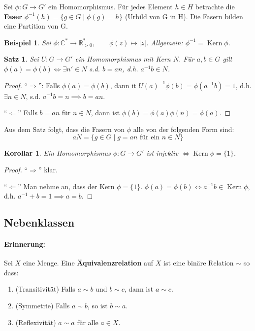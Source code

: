 \documentclass{article}
\theoremstyle{plain}
\newtheorem{theorem}{Satz}
\newtheorem{corollary}{Korollar}
\newtheorem{beispiel}{Beispiel}
\renewcommand{\ker}{\mathop{\mathrm{Kern}}}
\newcommand{\defn}[1]{\textbf{#1}}
\newcommand{\R}{\mathbb{R}}
\newcommand{\C}{\mathbb{C}}
\begin{document}
Sei $\phi\colon G\to G'$ ein Homomorphismus. Für jedes Element $h\in H$ betrachte die \defn{Faser} $\phi^{-1}(h)=\{g\in G\mid\phi(g)=h\}$ (Urbild von G in H).
Die Fasern bilden eine Partition von G.

\begin{beispiel} Sei $\phi\colon \C^*\to\R^*_{>0},\qquad \phi(z)\mapsto |z|$.\qquad
Allgemein: $\phi^{-1} = \ker \phi$.
\end{beispiel}

\begin{theorem}
    Sei $U: G\to G'$ ein Homomorphismus mit Kern $N$. Für $a,b\in G$ gilt $\phi(a)=\phi(b) \Leftrightarrow \exists n'\in N$ s.d. $b=an$, d.h. $a^{-1}b\in N$.
\end{theorem}
\begin{proof}
    ``$\Rightarrow$'': Falls $\phi(a)=\phi(b)$, dann it $U(a)^{-1}\phi(b)=\phi(a^{-1}b)=1$, d.h. $\exists n\in N$, s.d. $a^{-1}b=n \implies b=an$.
    
    ``$\Leftarrow$'' Falls $b=an$ für $n\in N$, dann ist $\phi(b)=\phi(a)\phi(n)=\phi(a)$.
\end{proof}
Aus dem Satz folgt, dass die Fasern von $\phi$ alle von der folgenden Form sind: $$aN=\{g\in G\mid g=an \text{ für ein } n\in N\}$$
\begin{corollary}
    Ein Homomorphismus $\phi\colon G\to G'$ ist injektiv $\Leftrightarrow \ker\phi = \{1\}$.
\end{corollary}
\begin{proof}
    ``$\Rightarrow$'' klar.

    ``$\Leftarrow$'' Man nehme an, dass der Kern $\phi= \{1\}$. $\phi(a)=\phi(b)\Leftrightarrow a^{-1}b\in\ker\phi$, d.h. $a^{-1}+b=1\implies a=b$.
\end{proof}
\subsection*{Nebenklassen}
\paragraph{Erinnerung:} Sei $X$ eine Menge. Eine \defn{Äquivalenzrelation} auf $X$ ist eine binäre  Relation $\sim$ so dass: 
\begin{enumerate}[label=\roman*)]
    \item (Transitivität) Falls $a\sim b$ und $b\sim c$, dann ist $a\sim c$.
    \item (Symmetrie) Falls $a\sim b$, so ist $b\sim a$.
    \item (Reflexivität) $a\sim a$ für alle $a\in X$.
\end{enumerate}
\end{document}
